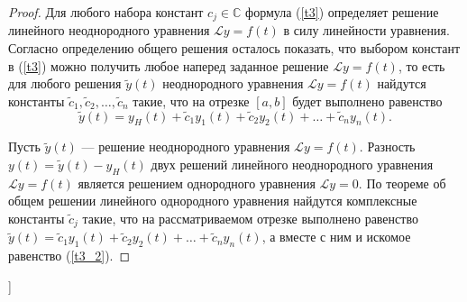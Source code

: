 \begin{proof} Для любого набора констант $c_j \in \mathbb{C}$ формула (\ref{t3}) определяет решение линейного неоднородного уравнения $\mathcal{L}y = f(t)$ в силу линейности уравнения. Согласно определению общего решения осталось показать, что выбором констант в (\ref{t3}) можно получить любое наперед заданное решение $\mathcal{L}y = f(t)$, то есть для любого решения $\tilde{y}(t)$ неоднородного уравнения $\mathcal{L}y = f(t)$ найдутся константы $\tilde{c}_1, \tilde{c}_2 ,\dots, \tilde{c}_n$ такие, что на отрезке $[a, b]$ будет выполнено равенство
\begin{equation}
    \tilde{y}(t) = y_H(t) + \tilde{c}_1y_1(t) + \tilde{c}_2y_2(t) +\dots + \tilde{c}_ny_n(t).
    \label{t3_2}
\end{equation}

Пусть $\tilde{y}(t)$ --- решение неоднородного уравнения $\mathcal{L}y = f(t)$. Разность $y(t) = \tilde{y}(t)-y_H(t)$ двух решений линейного неоднородного уравнения $\mathcal{L}y = f(t)$ является решением однородного уравнения $\mathcal{L}y = 0$. По теореме об общем решении линейного однородного уравнения найдутся комплексные константы $\tilde{c}_j$ такие, что на рассматриваемом отрезке выполнено равенство $\tilde{y}(t) = \tilde{c}_1y_1(t) + \tilde{c}_2y_2(t) +\dots + \tilde{c}_ny_n(t)$, а вместе с ним и искомое равенство (\ref{t3_2}).
\end{proof}




\bigbreak
[\cite[page 65-73]{denisov}]